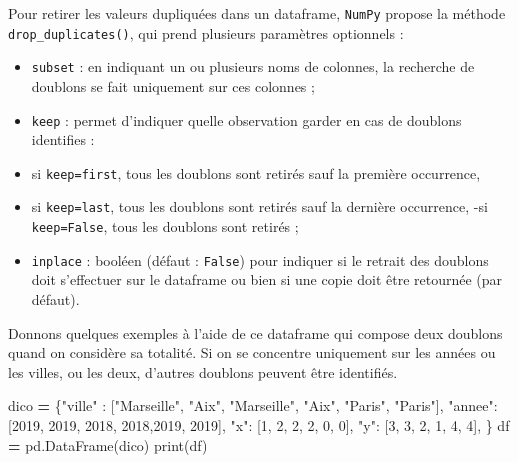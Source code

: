 \documentclass[12pt,]{book}
\newenvironment{Shaded}{\begin{snugshade}}{\end{snugshade}}
\newcommand{\DecValTok}[1]{\textcolor[rgb]{0.00,0.00,0.81}{#1}}
\newcommand{\StringTok}[1]{\textcolor[rgb]{0.31,0.60,0.02}{#1}}
\newcommand{\OperatorTok}[1]{\textcolor[rgb]{0.81,0.36,0.00}{\textbf{#1}}}
\newcommand{\BuiltInTok}[1]{#1}
\newcommand{\NormalTok}[1]{#1}
\numberwithin{equation}{section}
\numberwithin{countremarque}{section}
\begin{document}
Pour retirer les valeurs dupliquées dans un dataframe, \texttt{NumPy}
propose la méthode \texttt{drop\_duplicates()}, qui prend plusieurs
paramètres optionnels :

\begin{itemize}
\item
  \texttt{subset} : en indiquant un ou plusieurs noms de colonnes, la
  recherche de doublons se fait uniquement sur ces colonnes ;
\item
  \texttt{keep} : permet d'indiquer quelle observation garder en cas de
  doublons identifies :
\item
  si \texttt{keep=\textquotesingle{}first\textquotesingle{}}, tous les
  doublons sont retirés sauf la première occurrence,
\item
  si \texttt{keep=\textquotesingle{}last\textquotesingle{}}, tous les
  doublons sont retirés sauf la dernière occurrence, -si
  \texttt{keep=\textquotesingle{}False\textquotesingle{}}, tous les
  doublons sont retirés ;
\item
  \texttt{inplace} : booléen (défaut : \texttt{False}) pour indiquer si
  le retrait des doublons doit s'effectuer sur le dataframe ou bien si
  une copie doit être retournée (par défaut).
\end{itemize}

Donnons quelques exemples à l'aide de ce dataframe qui compose deux
doublons quand on considère sa totalité. Si on se concentre uniquement
sur les années ou les villes, ou les deux, d'autres doublons peuvent
être identifiés.

\begin{Shaded}
\begin{Highlighting}[]
\NormalTok{dico }\OperatorTok{=}\NormalTok{ \{}\StringTok{"ville"}\NormalTok{ : [}\StringTok{"Marseille"}\NormalTok{, }\StringTok{"Aix"}\NormalTok{,}
                   \StringTok{"Marseille"}\NormalTok{, }\StringTok{"Aix"}\NormalTok{, }\StringTok{"Paris"}\NormalTok{, }\StringTok{"Paris"}\NormalTok{],}
        \StringTok{"annee"}\NormalTok{: [}\DecValTok{2019}\NormalTok{, }\DecValTok{2019}\NormalTok{, }\DecValTok{2018}\NormalTok{, }\DecValTok{2018}\NormalTok{,}\DecValTok{2019}\NormalTok{, }\DecValTok{2019}\NormalTok{],}
        \StringTok{"x"}\NormalTok{: [}\DecValTok{1}\NormalTok{, }\DecValTok{2}\NormalTok{, }\DecValTok{2}\NormalTok{, }\DecValTok{2}\NormalTok{, }\DecValTok{0}\NormalTok{, }\DecValTok{0}\NormalTok{],}
        \StringTok{"y"}\NormalTok{: [}\DecValTok{3}\NormalTok{, }\DecValTok{3}\NormalTok{, }\DecValTok{2}\NormalTok{, }\DecValTok{1}\NormalTok{, }\DecValTok{4}\NormalTok{, }\DecValTok{4}\NormalTok{],}
\NormalTok{       \} }
\NormalTok{df }\OperatorTok{=}\NormalTok{ pd.DataFrame(dico)}
\BuiltInTok{print}\NormalTok{(df)}
\end{Highlighting}
\end{Shaded}
\end{document}
